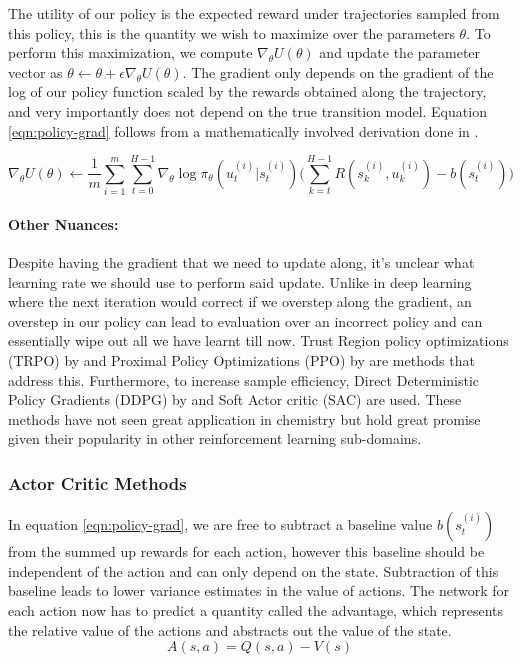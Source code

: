 The utility of our policy is the expected reward under trajectories sampled from this policy, this is the quantity we wish to maximize over the parameters $\theta$. To perform this maximization, we compute $\nabla_\theta U(\theta)$ and update the parameter vector as $\theta \leftarrow \theta + \epsilon \nabla_\theta U(\theta)$. The gradient only depends on the gradient of the log of our policy function scaled by the rewards obtained along the trajectory, and very importantly does not depend on the true transition model. Equation \ref{eqn:policy-grad} follows from a mathematically involved derivation done in \cite{}.

\begin{equation}\label{eqn:policy-grad}
    \nabla_\theta U(\theta) \leftarrow \frac{1}{m} \sum_{i=1}^{m} \sum_{t=0}^{H-1} \nabla_\theta \log \pi_\theta (u_t^{(i)}|s_t^{(i)}) \Bigg(\sum_{k=t}^{H-1} R(s_k^{(i)}, u_k^{(i)}) - b(s_t^{(i)})\Bigg)
\end{equation}

\paragraph{Other Nuances:} Despite having the gradient that we need to update along, it's unclear what learning rate we should use to perform said update. Unlike in deep learning where the next iteration would correct if we overstep along the gradient, an overstep in our policy can lead to evaluation over an incorrect policy and can essentially wipe out all we have learnt till now. Trust Region policy optimizations (TRPO) by \cite{trpo} and Proximal Policy Optimizations (PPO) by \cite{ppo} are methods that address this. Furthermore, to increase sample efficiency, Direct Deterministic Policy Gradients (DDPG) by \cite{ddpg} and Soft Actor critic (SAC) \cite{sac} are used. These methods have not seen great application in chemistry but hold great promise given their popularity in other reinforcement learning sub-domains.

\subsubsection{Actor Critic Methods}

In equation \ref{eqn:policy-grad}, we are free to subtract a baseline value $b(s_t^{(i)})$ from the summed up rewards for each action, however this baseline should be independent of the action and can only depend on the state. Subtraction of this baseline leads to lower variance estimates in the value of actions. The network for each action now has to predict a quantity called the advantage, which represents the relative value of the actions and abstracts out the value of the state.
\begin{equation}\label{eqn:advantage}
    A(s, a) = Q(s, a) - V(s)
\end{equation}

